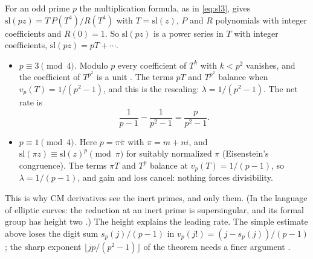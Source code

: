 \documentclass[11pt]{amsart}
\numberwithin{equation}{section}
\theoremstyle{definition}
\theoremstyle{remark}
\renewcommand{\sl}{\mathrm{sl}}
\begin{document}
For an odd prime $p$ the multiplication formula, as in \eqref{eq:sl3}, gives $\sl(pz)=T\,P(T^4)/R(T^4)$ with $T=\sl(z)$, $P$ and $R$ polynomials with integer coefficients and $R(0)=1$. So $\sl(pz)$ is a power series in $T$ with integer coefficients, $\sl(pz)=pT+\cdots$.
\begin{itemize}[leftmargin=2em]
\item \emph{$p\equiv3\pmod 4$.} Modulo $p$ every coefficient of $T^k$ with $k<p^2$ vanishes, and the coefficient of $T^{p^2}$ is a unit \cite{silverman}. The terms $pT$ and $T^{p^2}$ balance when $v_p(T)=1/(p^2-1)$, and this is the rescaling: $\lambda=1/(p^2-1)$. The net rate is
\begin{equation}
 \frac1{p-1}-\frac1{p^2-1}=\frac{p}{p^2-1}.
\end{equation}
\item \emph{$p\equiv1\pmod4$.} Here $p=\pi\bar\pi$ with $\pi=m+ni$, and $\sl(\pi z)\equiv\sl(z)^p\pmod\pi$ for suitably normalized $\pi$ (Eisenstein's congruence). The terms $\pi T$ and $T^p$ balance at $v_p(T)=1/(p-1)$, so $\lambda=1/(p-1)$, and gain and loss cancel: nothing forces divisibility.
\end{itemize}
This is why CM derivatives see the inert primes, and only them. (In the language of elliptic curves: the reduction at an inert prime is supersingular, and its formal group has height two \cite{silverman}.) The height explains the leading rate. The simple estimate above loses the digit sum $s_p(j)/(p-1)$ in $v_p(j!)=(j-s_p(j))/(p-1)$; the sharp exponent $\lfloor jp/(p^2-1)\rfloor$ of the theorem needs a finer argument \cite{earlier}.
\end{document}
